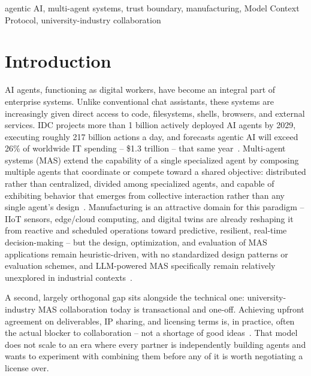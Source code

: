 \documentclass[10pt,conference]{IEEEtran}
\begin{document}
\begin{IEEEkeywords}
agentic AI, multi-agent systems, trust boundary, manufacturing, Model
Context Protocol, university-industry collaboration
\end{IEEEkeywords}

\section{Introduction}
\label{sec:intro}
AI agents, functioning as digital workers, have become an integral part of
enterprise systems. Unlike conventional chat assistants, these systems are
increasingly given direct access to code, filesystems, shells, browsers, and
external services. IDC projects more than 1 billion actively deployed AI
agents by 2029, executing roughly 217 billion actions a day, and forecasts
agentic AI will exceed 26\% of worldwide IT spending -- \$1.3 trillion -- that
same year~\cite{perilli2026agentic}. Multi-agent systems (MAS) extend the
capability of a single specialized agent by composing multiple agents that
coordinate or compete toward a shared objective: distributed rather than
centralized, divided among specialized agents, and capable of exhibiting
behavior that emerges from collective interaction rather than any single
agent's design~\cite{Barbosa2010,Leitao2012,Bussmann2004}. Manufacturing is
an attractive domain for this paradigm -- IIoT sensors, edge/cloud computing,
and digital twins are already reshaping it from reactive and scheduled
operations toward predictive, resilient, real-time decision-making -- but the
design, optimization, and evaluation of MAS applications remain
heuristic-driven, with no standardized design patterns or evaluation
schemes, and LLM-powered MAS specifically remain relatively unexplored in
industrial contexts~\cite{Farahani_2026}.

A second, largely orthogonal gap sits alongside the technical one:
university-industry MAS collaboration today is transactional and one-off.
Achieving upfront agreement on deliverables, IP sharing, and licensing terms
is, in practice, often the actual blocker to collaboration -- not a shortage
of good ideas~\cite{hargadon2003breakthroughs}. That model does not scale to
an era where every partner is independently building agents and wants to
experiment with combining them before any of it is worth negotiating a
license over.
\end{document}
